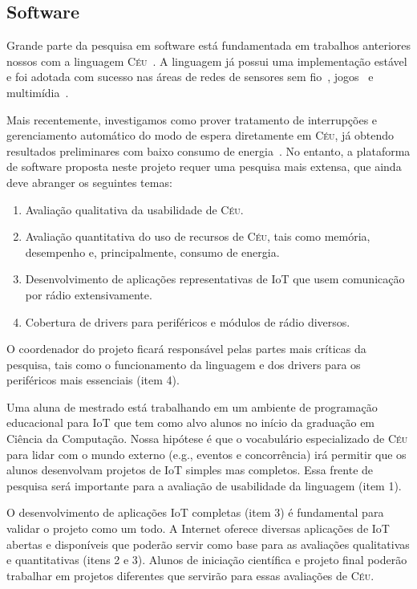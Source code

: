 \documentclass[titlepage,12pt]{article}
\newcommand{\CEU}{\textsc{C\'{e}u}\xspace}
\begin{document}
\subsection{Software}
\label{sec.metodologia.software}

Grande parte da pesquisa em software está fundamentada em trabalhos anteriores
nossos com a linguagem \CEU~\cite{ceu.sensys13,ceu.tecs17,ceu.lctes18}.
A linguagem já possui uma implementação estável e foi adotada com sucesso nas
áreas de redes de sensores sem fio~\cite{ceu.sensys13,ceu.terra},
jogos~\cite{ceu.mod15} e multimídia~\cite{ceumedia.webmedia16}.

Mais recentemente, investigamos como prover tratamento de interrupções e
gerenciamento automático do modo de espera diretamente em \CEU, já obtendo
resultados preliminares com baixo consumo de energia~\cite{ceu.lctes18.short}.
%
No entanto, a plataforma de software proposta neste projeto requer uma pesquisa
mais extensa, que ainda deve abranger os seguintes temas:
%
\begin{enumerate}
\item Avaliação qualitativa da usabilidade de \CEU.
\item Avaliação quantitativa do uso de recursos de \CEU, tais como memória,
      desempenho e, principalmente, consumo de energia.
\item Desenvolvimento de aplicações representativas de IoT que usem comunicação
      por rádio extensivamente.
\item Cobertura de drivers para periféricos e módulos de rádio diversos.
\end{enumerate}

O coordenador do projeto ficará responsável pelas partes mais críticas da
pesquisa, tais como o funcionamento da linguagem e dos drivers para os
periféricos mais essenciais (item 4).

Uma aluna de mestrado está trabalhando em um ambiente de programação
educacional para IoT que tem como alvo alunos no início da graduação em Ciência
da Computação.
Nossa hipótese é que o vocabulário especializado de \CEU para lidar com o mundo
externo (e.g., eventos e concorrência) irá permitir que os alunos desenvolvam
projetos de IoT simples mas completos.
Essa frente de pesquisa será importante para a avaliação de usabilidade da
linguagem (item 1).

O desenvolvimento de aplicações IoT completas (item 3) é fundamental para
validar o projeto como um todo.
A Internet oferece diversas aplicações de IoT abertas e disponíveis que poderão
servir como base para as avaliações qualitativas e quantitativas (itens 2 e 3).
Alunos de iniciação científica e projeto final poderão trabalhar em projetos
diferentes que servirão para essas avaliações de \CEU.
\end{document}
